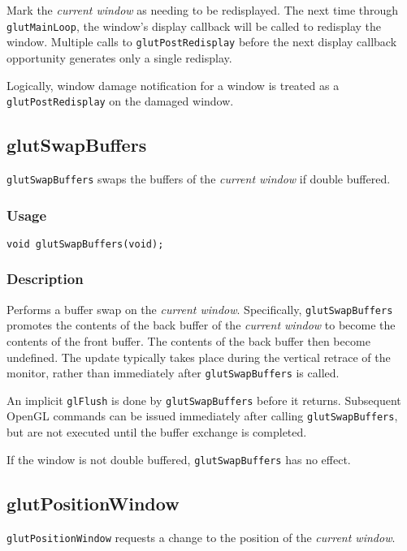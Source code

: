 Mark the {\em current window} as needing to be redisplayed.  The next time
through {\tt glutMainLoop}, the window's display callback will be called
to redisplay the window.  Multiple calls to {\tt glutPostRedisplay}
before the next display callback opportunity generates only a single
redisplay.

Logically, window damage notification for a window is treated as a
{\tt glutPostRedisplay} on the damaged window.

\subsection{glutSwapBuffers}

{\tt glutSwapBuffers} swaps the buffers of the {\em current window} if double buffered.

\subsubsection*{Usage}
\begin{verbatim}
void glutSwapBuffers(void);
\end{verbatim}

\subsubsection*{Description}

Performs a buffer swap on the {\em current window}.  Specifically, {\tt glutSwapBuffers}
promotes the contents of the back buffer of the {\em current window} to become the
contents of the front buffer.  The contents of the back buffer then
become undefined.  The update typically takes place during the vertical
retrace of the monitor, rather than immediately after {\tt glutSwapBuffers}
is called.

An implicit {\tt glFlush} is done by {\tt glutSwapBuffers} before it returns.
Subsequent OpenGL commands can be issued immediately after calling
{\tt glutSwapBuffers}, but are not executed until the buffer exchange
is completed.

If the window is not
double buffered, {\tt glutSwapBuffers} has no effect.

\subsection{glutPositionWindow}

{\tt glutPositionWindow} requests a change to the position of
the {\em current window}.

